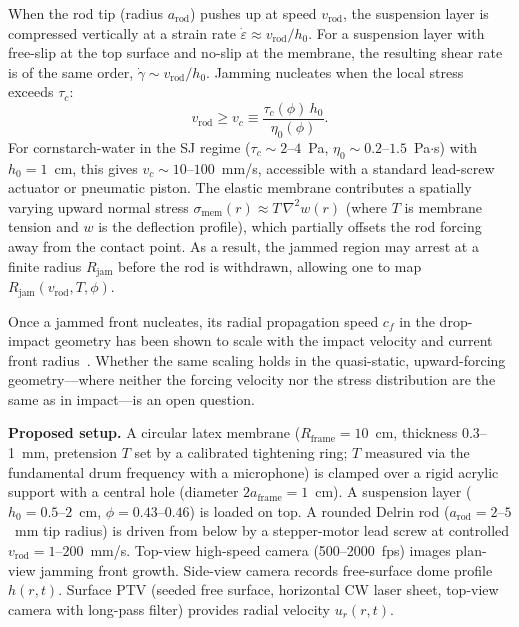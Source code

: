 \documentclass[aps,preprint,superscriptaddress,longbibliography]{revtex4-2}
\newcommand{\tauc}{\tau_c}
\newcommand{\etaz}{\eta_0}
\begin{document}
When the rod tip (radius $a_\text{rod}$) pushes up at speed $v_\text{rod}$,
the suspension layer is compressed vertically at a strain rate
$\dot{\varepsilon} \approx v_\text{rod}/h_0$.  For a suspension layer with
free-slip at the top surface and no-slip at the membrane, the resulting shear
rate is of the same order, $\dot{\gamma} \sim v_\text{rod}/h_0$.  Jamming
nucleates when the local stress exceeds $\tauc$:
\begin{equation}
  v_\text{rod} \geq v_c \equiv \frac{\tauc(\phi)\,h_0}{\etaz(\phi)}.
  \label{eq:vc}
\end{equation}
For cornstarch-water in the SJ regime ($\tauc \sim 2$--$4$~Pa,
$\etaz \sim 0.2$--$1.5$~Pa$\cdot$s) with $h_0 = 1$~cm, this gives
$v_c \sim 10$--$100$~mm/s, accessible with a standard lead-screw actuator or
pneumatic piston.  The elastic membrane contributes a spatially varying upward
normal stress $\sigma_\text{mem}(r) \approx T\,\nabla^2 w(r)$ (where $T$ is
membrane tension and $w$ is the deflection profile), which partially offsets
the rod forcing away from the contact point.  As a result, the jammed region
may arrest at a finite radius $R_\text{jam}$ before the rod is withdrawn,
allowing one to map $R_\text{jam}(v_\text{rod}, T, \phi)$.

Once a jammed front nucleates, its radial propagation speed $c_f$ in the
drop-impact geometry has been shown to scale with the impact velocity and
current front radius~\cite{WaitukaitisJaeger2012,Rathee2022PNAS}.  Whether
the same scaling holds in the quasi-static, upward-forcing geometry---where
neither the forcing velocity nor the stress distribution are the same as in
impact---is an open question.

\begin{mdframed}[style=setupbox]
\textbf{Proposed setup.}
A circular latex membrane ($R_\text{frame} = 10$~cm, thickness 0.3--1~mm,
pretension $T$ set by a calibrated tightening ring; $T$ measured via the
fundamental drum frequency with a microphone) is clamped over a rigid acrylic
support with a central hole (diameter $2a_\text{frame} = 1$~cm).  A suspension
layer ($h_0 = 0.5$--$2$~cm, $\phi = 0.43$--$0.46$) is loaded on top.  A
rounded Delrin rod ($a_\text{rod} = 2$--$5$~mm tip radius) is driven from below
by a stepper-motor lead screw at controlled $v_\text{rod} = 1$--$200$~mm/s.
Top-view high-speed camera (500--2000~fps) images plan-view jamming front
growth.  Side-view camera records free-surface dome profile $h(r,t)$.  Surface
PTV (seeded free surface, horizontal CW laser sheet, top-view camera with
long-pass filter) provides radial velocity $u_r(r,t)$.
\end{mdframed}
\end{document}
